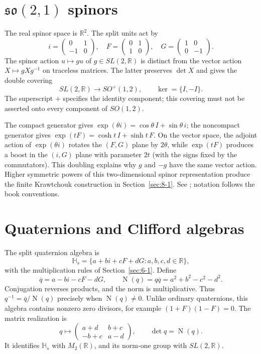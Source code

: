 \section{$\mathfrak{so}(2,1)$ spinors}
\label{sec:6-2}
The real spinor space is $\mathbb R^2$. The split units act by
\[
i=\begin{pmatrix}0&1\\-1&0\end{pmatrix},\quad
F=\begin{pmatrix}0&1\\1&0\end{pmatrix},\quad
G=\begin{pmatrix}1&0\\0&-1\end{pmatrix}.
\]
The spinor action $u\mapsto gu$ of $g\in SL(2,\mathbb R)$ is distinct
from the vector action $X\mapsto gXg^{-1}$ on traceless matrices.
The latter preserves $\det X$ and gives the double covering
\[
SL(2,\mathbb R)\longrightarrow SO^+(1,2),\qquad
\ker=\{I,-I\}.
\]
The superscript $+$ specifies the identity component; this covering
must not be asserted onto every component of $SO(1,2)$.

The compact generator gives
$\exp(\theta i)=\cos\theta\,I+\sin\theta\,i$; the noncompact generator gives
$\exp(tF)=\cosh t\,I+\sinh t\,F$.
On the vector space, the adjoint action of $\exp(\theta i)$ rotates the
$(F,G)$ plane by $2\theta$, while $\exp(tF)$ produces a boost in the
$(i,G)$ plane with parameter $2t$ (with the signs fixed by the commutators).
This doubling explains why $g$ and $-g$ have the same vector action.
Higher symmetric powers of this two-dimensional spinor representation
produce the finite Krawtchouk construction in Section~\ref{sec:8-1}.
See \cite[Section~7]{KocikFeynman}; notation follows the book conventions.

\section{Quaternions and Clifford algebras}
\label{sec:6-3}
The split quaternion algebra is
\[
\mathbb H_s=\{a+bi+cF+dG:a,b,c,d\in\mathbb R\},
\]
with the multiplication rules of Section~\ref{sec:6-1}. Define
\[
\overline q=a-bi-cF-dG,\qquad
\operatorname{N}(q)=q\overline q=a^2+b^2-c^2-d^2.
\]
Conjugation reverses products, and the norm is multiplicative. Thus
$q^{-1}=\overline q/\operatorname{N}(q)$ precisely when
$\operatorname{N}(q)\ne0$. Unlike ordinary quaternions, this algebra
contains nonzero zero divisors, for example $(1+F)(1-F)=0$.
The matrix realization is
\[
q\longmapsto\begin{pmatrix}a+d&b+c\\-b+c&a-d\end{pmatrix},
\qquad \det q=\operatorname{N}(q).
\]
It identifies $\mathbb H_s$ with $M_2(\mathbb R)$, and its norm-one group
with $SL(2,\mathbb R)$.

